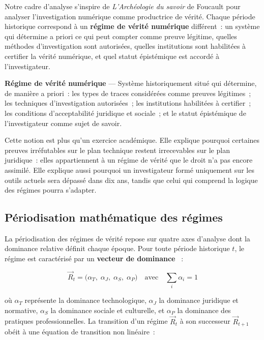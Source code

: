 Notre cadre d'analyse s'inspire de \textit{L'Archéologie du savoir} de
Foucault \cite{foucault1969} pour analyser l'investigation numérique comme
 productrice de vérité. Chaque période
historique correspond à un \textbf{régime de vérité numérique} différent~:
un système qui détermine a priori ce qui peut compter comme preuve légitime,
quelles méthodes d'investigation sont autorisées, quelles institutions sont
habilitées à certifier la vérité numérique, et quel statut épistémique est
accordé à l'investigateur.

\begin{boxdef}
\textbf{Régime de vérité numérique} --- Système
historiquement situé qui détermine, de manière a priori~: les types de
traces considérées comme preuves légitimes~; les techniques d'investigation
autorisées~; les institutions habilitées à certifier~; les conditions
d'acceptabilité juridique et sociale~; et le statut épistémique de
l'investigateur comme sujet de savoir.
\end{boxdef}

Cette notion est plus qu'un exercice académique. Elle explique pourquoi
certaines preuves irréfutables sur le plan technique restent irrecevables
sur le plan juridique~: elles appartiennent à un régime de vérité que le
droit n'a pas encore assimilé. Elle explique aussi pourquoi un investigateur
formé uniquement sur les outils actuels sera dépassé dans dix ans, tandis
que celui qui comprend la logique des régimes pourra s'adapter.

\subsection{Périodisation mathématique des régimes}

La périodisation des régimes de vérité repose sur quatre axes d'analyse
dont la dominance relative définit chaque époque. Pour toute période
historique $t$, le régime est caractérisé par un \textbf{vecteur de
dominance} \cite{minka2025cro}~:

\begin{equation}
\vec{R}_t = \bigl(\alpha_T,\; \alpha_J,\; \alpha_S,\; \alpha_P\bigr)
\quad \text{avec} \quad \sum_{i} \alpha_i = 1
\label{eq:vecteur-regime}
\end{equation}

où $\alpha_T$ représente la dominance technologique, $\alpha_J$ la
dominance juridique et normative, $\alpha_S$ la dominance sociale et
culturelle, et $\alpha_P$ la dominance des pratiques professionnelles.
La transition d'un régime $\vec{R}_t$ à son successeur $\vec{R}_{t+1}$
obéit à une équation de transition non linéaire~:

